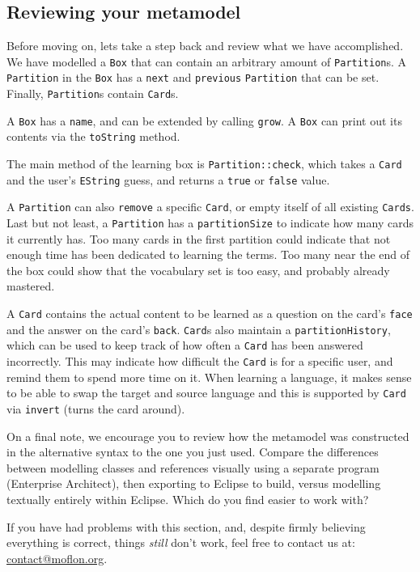 \newpage 
\genHeader
\subsection{Reviewing your metamodel}
\hypertarget{static review}{}

Before moving on, lets take a step back and review what we have accomplished. We have modelled a \texttt{Box} that can contain an arbitrary amount of
\texttt{Partition}s. A \texttt{Partition} in the \texttt{Box} has a \texttt{next} and \texttt{previous} \texttt{Partition} that can be set. Finally,
\texttt{Partition}s contain \texttt{Card}s.

A \texttt{Box} has a \texttt{name}, and can be extended by calling \texttt{grow}. A \texttt{Box} can print out its contents via the \texttt{toString} method.

The main method of the learning box is \texttt{Partition::check}, which takes a \texttt{Card} and the user's \texttt{EString} guess, and returns a \texttt{true}
or \texttt{false} value.

A \texttt{Partition} can also \texttt{remove} a specific \texttt{Card}, or empty itself of all  existing \texttt{Cards}. Last but not least, a
\texttt{Partition} has a \texttt{partitionSize} to indicate how many cards it currently has. Too many cards in the first partition could indicate that not
enough time has been dedicated to learning the terms. Too many near the end of the box could show that the vocabulary set is too easy, and probably
already mastered.

A \texttt{Card} contains the actual content to be learned as a question on the card's \texttt{face} and the answer on the card's \texttt{back}. \texttt{Card}s
also maintain a \texttt{partition\-History}, which can be used to keep track of how often a \texttt{Card} has been answered incorrectly.
This may indicate how difficult the \texttt{Card} is for a specific user, and remind them to spend more time on it. When learning a language, it makes
sense to be able to swap the target and source language and this is supported by \texttt{Card} via \texttt{invert} (turns the card around).

On a final note, we encourage you to review how the metamodel was constructed in the alternative syntax to the one you just used. Compare the
differences between modelling classes and references visually using a separate program (Enterprise Architect), then exporting to Eclipse to build, versus
modelling textually entirely within Eclipse. Which do you find easier to work with?

If you have had problems with this section, and, despite firmly believing everything is correct, things \emph{still} don't work, feel free to contact us at:\\ 
\href{mailto:contact@moflon.org}{contact@moflon.org}.

